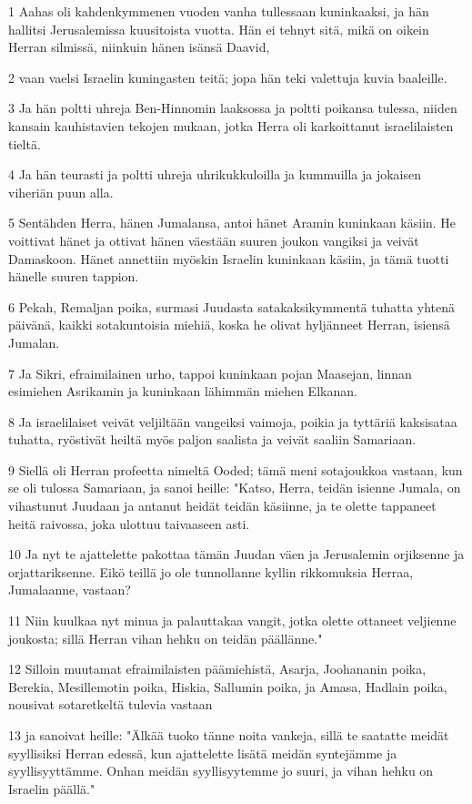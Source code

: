 \par 1 Aahas oli kahdenkymmenen vuoden vanha tullessaan kuninkaaksi, ja hän hallitsi Jerusalemissa kuusitoista vuotta. Hän ei tehnyt sitä, mikä on oikein Herran silmissä, niinkuin hänen isänsä Daavid,
\par 2 vaan vaelsi Israelin kuningasten teitä; jopa hän teki valettuja kuvia baaleille.
\par 3 Ja hän poltti uhreja Ben-Hinnomin laaksossa ja poltti poikansa tulessa, niiden kansain kauhistavien tekojen mukaan, jotka Herra oli karkoittanut israelilaisten tieltä.
\par 4 Ja hän teurasti ja poltti uhreja uhrikukkuloilla ja kummuilla ja jokaisen viheriän puun alla.
\par 5 Sentähden Herra, hänen Jumalansa, antoi hänet Aramin kuninkaan käsiin. He voittivat hänet ja ottivat hänen väestään suuren joukon vangiksi ja veivät Damaskoon. Hänet annettiin myöskin Israelin kuninkaan käsiin, ja tämä tuotti hänelle suuren tappion.
\par 6 Pekah, Remaljan poika, surmasi Juudasta satakaksikymmentä tuhatta yhtenä päivänä, kaikki sotakuntoisia miehiä, koska he olivat hyljänneet Herran, isiensä Jumalan.
\par 7 Ja Sikri, efraimilainen urho, tappoi kuninkaan pojan Maasejan, linnan esimiehen Asrikamin ja kuninkaan lähimmän miehen Elkanan.
\par 8 Ja israelilaiset veivät veljiltään vangeiksi vaimoja, poikia ja tyttäriä kaksisataa tuhatta, ryöstivät heiltä myös paljon saalista ja veivät saaliin Samariaan.
\par 9 Siellä oli Herran profeetta nimeltä Ooded; tämä meni sotajoukkoa vastaan, kun se oli tulossa Samariaan, ja sanoi heille: "Katso, Herra, teidän isienne Jumala, on vihastunut Juudaan ja antanut heidät teidän käsiinne, ja te olette tappaneet heitä raivossa, joka ulottuu taivaaseen asti.
\par 10 Ja nyt te ajattelette pakottaa tämän Juudan väen ja Jerusalemin orjiksenne ja orjattariksenne. Eikö teillä jo ole tunnollanne kyllin rikkomuksia Herraa, Jumalaanne, vastaan?
\par 11 Niin kuulkaa nyt minua ja palauttakaa vangit, jotka olette ottaneet veljienne joukosta; sillä Herran vihan hehku on teidän päällänne."
\par 12 Silloin muutamat efraimilaisten päämiehistä, Asarja, Joohananin poika, Berekia, Mesillemotin poika, Hiskia, Sallumin poika, ja Amasa, Hadlain poika, nousivat sotaretkeltä tulevia vastaan
\par 13 ja sanoivat heille: "Älkää tuoko tänne noita vankeja, sillä te saatatte meidät syyllisiksi Herran edessä, kun ajattelette lisätä meidän syntejämme ja syyllisyyttämme. Onhan meidän syyllisyytemme jo suuri, ja vihan hehku on Israelin päällä."
